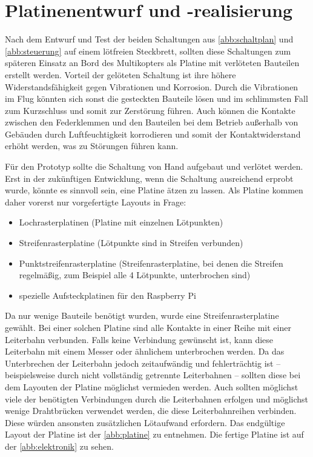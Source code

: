 \documentclass[a4paper,12pt,bibliography=totoc, listof=totoc,titlepage,pointlessnumbers]{scrreprt}
\begin{document}
\section{Platinenentwurf und -realisierung}
Nach dem Entwurf und Test der beiden Schaltungen aus \autoref{abb:schaltplan} und \autoref{abb:steuerung} auf einem lötfreien Steckbrett, sollten diese Schaltungen zum späteren Einsatz an Bord des Multikopters als Platine mit verlöteten Bauteilen erstellt werden. Vorteil der gelöteten Schaltung ist ihre höhere Widerstandsfähigkeit gegen Vibrationen und Korrosion. Durch die Vibrationen im Flug könnten sich sonst die gesteckten Bauteile lösen und im schlimmsten Fall zum Kurzschluss und somit zur Zerstörung führen. Auch können die Kontakte zwischen den Federklemmen und den Bauteilen bei dem Betrieb außerhalb von Gebäuden durch Luftfeuchtigkeit korrodieren und somit der Kontaktwiderstand erhöht werden, was zu Störungen führen kann.

Für den Prototyp sollte die Schaltung von Hand aufgebaut und verlötet werden. Erst in der zukünftigen Entwicklung, wenn die Schaltung ausreichend erprobt wurde, könnte es sinnvoll sein, eine Platine ätzen zu lassen. Als Platine kommen daher vorerst nur vorgefertigte Layouts in Frage:

\begin{itemize}
 \item Lochrasterplatinen (Platine mit einzelnen Lötpunkten)
 \item Streifenrasterplatine (Lötpunkte sind in Streifen verbunden)
 \item Punktstreifenrasterplatine (Streifenrasterplatine, bei denen die Streifen regelmäßig, zum Beispiel alle 4 Lötpunkte, unterbrochen sind)
 \item spezielle Aufsteckplatinen für den Rasp\-berry Pi
\end{itemize}

Da nur wenige Bauteile benötigt wurden, wurde eine Streifenrasterplatine gewählt. Bei einer solchen Platine sind alle Kontakte in einer Reihe mit einer Leiterbahn verbunden. Falls keine Verbindung gewünscht ist, kann diese Leiterbahn mit einem Messer oder ähnlichem unterbrochen werden. Da das Unterbrechen der Leiterbahn jedoch zeitaufwändig und fehlerträchtig ist -- beispielsweise durch nicht vollständig getrennte Leiterbahnen -- sollten diese bei dem Layouten der Platine möglichst vermieden werden. Auch sollten möglichst viele der benötigten Verbindungen durch die Leiterbahnen erfolgen und möglichst wenige Drahtbrücken verwendet werden, die diese Leiterbahnreihen verbinden. Diese würden ansonsten zusätzlichen Lötaufwand erfordern. Das endgültige Layout der Platine ist der \autoref{abb:platine} zu entnehmen. Die fertige Platine ist auf der \autoref{abb:elektronik} zu sehen.
\end{document}
